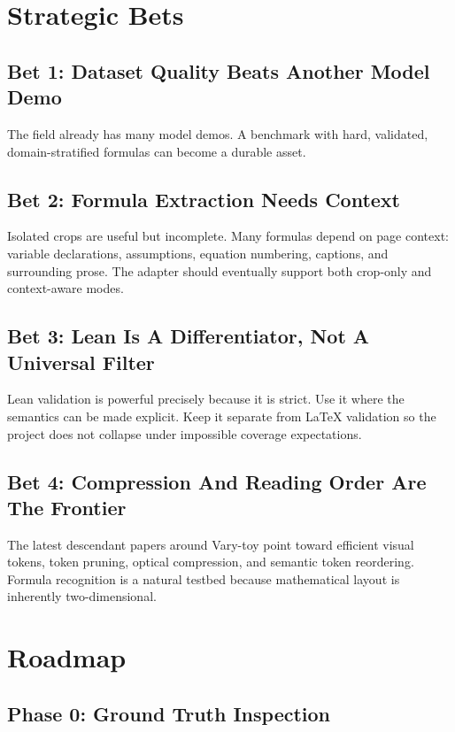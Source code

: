\documentclass[11pt]{article}
\begin{document}
\section{Strategic Bets}

\subsection{Bet 1: Dataset Quality Beats Another Model Demo}

The field already has many model demos. A benchmark with hard, validated, domain-stratified formulas can become a durable asset.

\subsection{Bet 2: Formula Extraction Needs Context}

Isolated crops are useful but incomplete. Many formulas depend on page context: variable declarations, assumptions, equation numbering, captions, and surrounding prose. The adapter should eventually support both crop-only and context-aware modes.

\subsection{Bet 3: Lean Is A Differentiator, Not A Universal Filter}

Lean validation is powerful precisely because it is strict. Use it where the semantics can be made explicit. Keep it separate from LaTeX validation so the project does not collapse under impossible coverage expectations.

\subsection{Bet 4: Compression And Reading Order Are The Frontier}

The latest descendant papers around Vary-toy point toward efficient visual tokens, token pruning, optical compression, and semantic token reordering. Formula recognition is a natural testbed because mathematical layout is inherently two-dimensional.

\section{Roadmap}

\subsection{Phase 0: Ground Truth Inspection}
\end{document}
